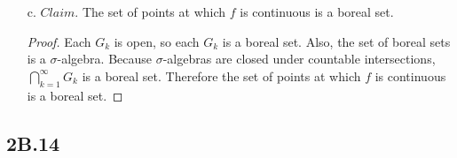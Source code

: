 \documentclass[12pt]{article}
\begin{document}
\begin{itemize}
    \newpage

    \item[c.] $Claim.$ The set of points at which $f$ is continuous is a boreal set.
    
    \begin{proof}
        Each $G_k$ is open, so each $G_k$ is a boreal set. Also, the set of boreal sets is a $\sigma$-algebra. Because $\sigma$-algebras are closed under countable intersections, $\bigcap_{k=1}^\infty G_k$ is a boreal set. Therefore the set of points at which $f$ is continuous is a boreal set.
    \end{proof}
\end{itemize}

\subsection*{2B.14}
\end{document}
